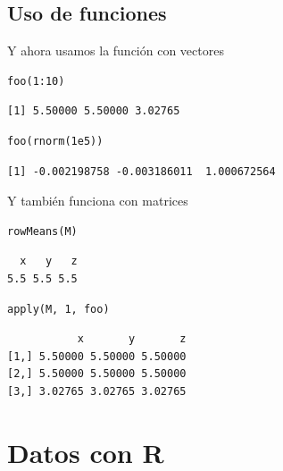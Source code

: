 \documentclass[xcolor={usenames,svgnames,dvipsnames}]{beamer}
\begin{document}
\subsection{Uso de funciones}
\label{sec-4-2}
\begin{frame}[fragile,label=sec-4-2-1]{Y ahora usamos la función con vectores}
 \lstset{language=R,label= ,caption= ,numbers=none}
\begin{lstlisting}
foo(1:10)
\end{lstlisting}

\begin{verbatim}
[1] 5.50000 5.50000 3.02765
\end{verbatim}

\lstset{language=R,label= ,caption= ,numbers=none}
\begin{lstlisting}
foo(rnorm(1e5))
\end{lstlisting}

\begin{verbatim}
[1] -0.002198758 -0.003186011  1.000672564
\end{verbatim}
\end{frame}

\begin{frame}[fragile,label=sec-4-2-2]{Y también funciona con matrices}
 \lstset{language=R,label= ,caption= ,numbers=none}
\begin{lstlisting}
rowMeans(M)
\end{lstlisting}

\begin{verbatim}
  x   y   z 
5.5 5.5 5.5
\end{verbatim}

\lstset{language=R,label= ,caption= ,numbers=none}
\begin{lstlisting}
apply(M, 1, foo)
\end{lstlisting}

\begin{verbatim}
           x       y       z
[1,] 5.50000 5.50000 5.50000
[2,] 5.50000 5.50000 5.50000
[3,] 3.02765 3.02765 3.02765
\end{verbatim}
\end{frame}


\section{Datos con R}
\label{sec-5}
\end{document}
